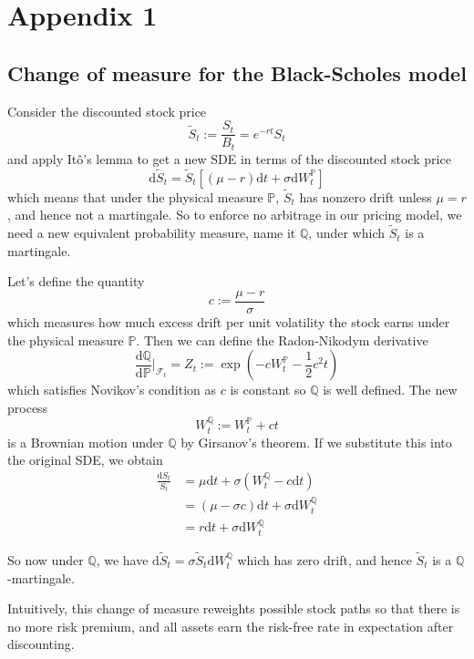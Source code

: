 \chapter{Appendix 1}

\section{Change of measure for the Black-Scholes model}
\label{sec:change_of_measure}

Consider the discounted stock price
\begin{equation}
    \tilde S_t := \frac {S_t}{B_t} = e^{-rt} S_t
\end{equation}
and apply Itô's lemma to get a new SDE in terms of the discounted stock price
\begin{equation}
    \mathrm d \tilde S_t = \tilde S_t[(\mu-r)\mathrm dt + \sigma \mathrm dW_t^\mathbb P]
\end{equation}
which means that under the physical measure $\mathbb P$, $\tilde S_t$ has nonzero drift unless $\mu = r$, and hence not a martingale. So to enforce no arbitrage in our pricing model, we need a new equivalent probability measure, name it $\mathbb Q$, under which $\tilde S_t$ is a martingale.

Let's define the quantity
\begin{equation}
    c := \frac{\mu -r}{\sigma}
\end{equation}
which measures how much excess drift per unit volatility the stock earns under the physical measure $\mathbb P$. Then we can define the Radon-Nikodym derivative
\begin{equation}
    \frac{\mathrm d\mathbb Q}{\mathrm d \mathbb P}\bigg|_{\mathcal F_t} = Z_t := \exp \left(-cW_t^\mathbb P- \frac 12 c^2 t\right)
\end{equation}
which satisfies Novikov's condition as $c$ is constant so $\mathbb Q$ is well defined. The new process
\begin{equation}
    W_t^\mathbb Q := W_t^\mathbb P + ct
\end{equation}
is a Brownian motion under $\mathbb Q$ by Girsanov's theorem. If we substitute this into the original SDE, we obtain
\begin{align}
    \frac{\mathrm dS_t}{S_t} &= \mu \mathrm dt + \sigma(W_t^\mathbb Q - c\mathrm dt) \\
    &= (\mu - \sigma c) \mathrm dt + \sigma \mathrm dW_t^\mathbb Q \\
    &= r \mathrm dt + \sigma \mathrm dW_t^\mathbb Q
\end{align}

So now under $\mathbb Q$, we have $\mathrm d\tilde S_t = \sigma \tilde S_t \mathrm d W_t ^\mathbb Q$ which has zero drift, and hence $\tilde S_t$ is a $\mathbb Q$-martingale.

Intuitively, this change of measure reweights possible stock paths so that there is no more risk premium, and all assets earn the risk-free rate in expectation after discounting.